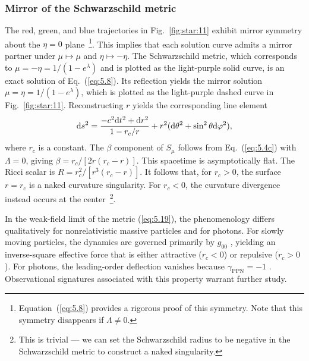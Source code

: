 \documentclass[aps,prd,twocolumn]{revtex4-2}
\newcommand\dx{{\rm d}}
\begin{document}
\subsubsection{Mirror of the Schwarzschild metric}\label{sec:V.C.2}
The red, green, and blue trajectories in Fig.~\ref{fig:star:11} exhibit mirror symmetry about the $\eta=0$ plane~\footnote{Equation~(\ref{eq:5.8}) provides a rigorous proof of this symmetry. Note that this symmetry disappears if $\Lambda\neq0$.}. This implies that each solution curve admits a mirror partner under $\mu\mapsto\mu$ and $\eta\mapsto-\eta$. The Schwarzschild metric, which corresponds to $\mu=-\eta=1/(1-e^\lambda)$ and is plotted as the light-purple solid curve, is an exact solution of Eq.~(\ref{eq:5.8}). Its reflection yields the mirror solution $\mu=\eta=1/(1-e^\lambda)$, which is plotted as the light-purple dashed curve in Fig.~\ref{fig:star:11}. Reconstructing $r$ yields the corresponding line element
\begin{equation}\label{eq:5.19}
  \dx s^2 = \frac{- c^2\dx t^2 + \dx r^2}{1-r_c/r} + r^2(\dx\theta^2+\sin^2\theta\dx\varphi^2),
\end{equation}
where $r_c$ is a constant. The $\beta$ component of $S_\mu$ follows from Eq.~(\ref{eq:5.4c}) with $\Lambda=0$, giving $\beta = r_c/[2r(r_c-r)]$. This spacetime is asymptotically flat. The Ricci scalar is $R=r_c^2/[r^3(r_c-r)]$. It follows that, for $r_c>0$, the surface $r=r_c$ is a naked curvature singularity. For $r_c<0$, the curvature divergence instead occurs at the center~\footnote{This is trivial --- we can set the Schwarzschild radius to be negative in the Schwarzschild metric to construct a naked singularity.}.

In the weak-field limit of the metric (\ref{eq:5.19}), the phenomenology differs qualitatively for nonrelativistic massive particles and for photons. For slowly moving particles, the dynamics are governed primarily by $g_{00}$ \cite{Bertschinger2011.PhilTransRSocA.369.4947}, yielding an inverse-square effective force that is either attractive ($r_c<0$) or repulsive ($r_c>0$). For photons, the leading-order deflection vanishes because $\gamma_\mathrm{PPN}=-1$ \cite{Will2014.LRR.17.4,Bertschinger2011.PhilTransRSocA.369.4947}. Observational signatures associated with this property warrant further study.
\end{document}
